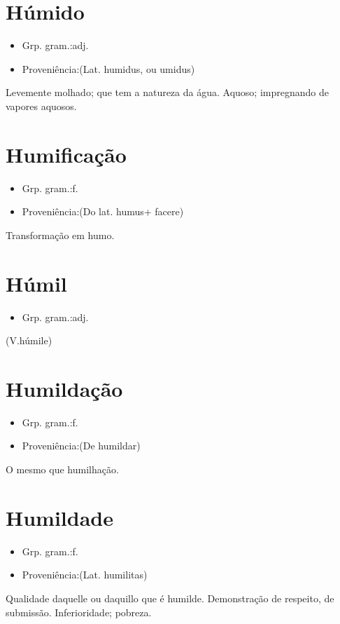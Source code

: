 \documentclass{article}
\begin{document}
\section{Húmido}
\begin{itemize}
\item {Grp. gram.:adj.}
\end{itemize}
\begin{itemize}
\item {Proveniência:(Lat. \textunderscore humidus\textunderscore , ou \textunderscore umidus\textunderscore )}
\end{itemize}
Levemente molhado; que tem a natureza da água.
Aquoso; impregnando de vapores aquosos.
\section{Humificação}
\begin{itemize}
\item {Grp. gram.:f.}
\end{itemize}
\begin{itemize}
\item {Proveniência:(Do lat. \textunderscore humus\textunderscore  + \textunderscore facere\textunderscore )}
\end{itemize}
Transformação em humo.
\section{Húmil}
\begin{itemize}
\item {Grp. gram.:adj.}
\end{itemize}
(V.húmile)
\section{Humildação}
\begin{itemize}
\item {Grp. gram.:f.}
\end{itemize}
\begin{itemize}
\item {Proveniência:(De \textunderscore humildar\textunderscore )}
\end{itemize}
O mesmo que \textunderscore humilhação\textunderscore .
\section{Humildade}
\begin{itemize}
\item {Grp. gram.:f.}
\end{itemize}
\begin{itemize}
\item {Proveniência:(Lat. \textunderscore humilitas\textunderscore )}
\end{itemize}
Qualidade daquelle ou daquillo que é humilde.
Demonstração de respeito, de submissão.
Inferioridade; pobreza.
\end{document}
